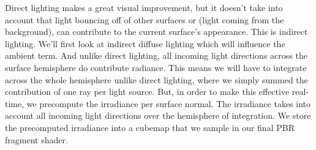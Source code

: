 \documentclass{article}
\begin{document}
Direct lighting makes a great visual improvement, but it doesn't take into account
that light bouncing off of other surfaces or (light coming from the background), can contribute to the current surface's
appearance. This is indirect lighting. We'll first look at indirect diffuse lighting which will influence the ambient term.
And unlike direct lighting, all incoming light directions across the surface hemisphere do contribute radiance. This means we will
have to integrate across the whole hemisphere unlike direct lighting, where we simply summed the contribution of one ray per light source.
But, in order to make this effective real-time, we precompute the irradiance per surface normal. The irradiance takes into account all incoming light
directions over the hemisphere of integration. We store the precomputed irradiance into a cubemap that we sample in our final PBR fragment shader.
\end{document}
